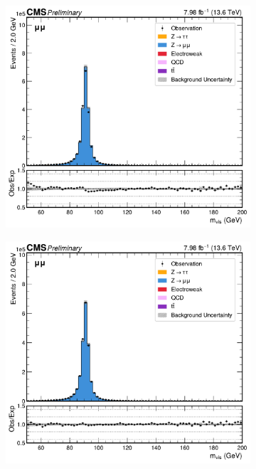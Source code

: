 \begin{figure}[!htbp]
        \centering
        \begin{subfigure}[b]{0.49\textwidth}
            \centering
            \includegraphics[width=\textwidth]{Figures/Chapter7/zpt_mvis_without.pdf}
            \caption{}
        \end{subfigure}
        \begin{subfigure}[b]{0.49\textwidth}
            \centering
            \includegraphics[width=\textwidth]{Figures/Chapter7/zpt_mvis_with.pdf}
            \caption{}
        \end{subfigure}


\end{figure}
